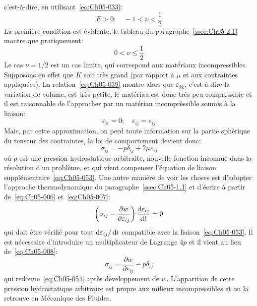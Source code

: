 c'est-à-dire, en utilisant~\eqref{eq:Ch05-033}: 
\begin{equation}
    E>0; \quad -1 < \nu < \frac{1}{2}
    \label{eq:Ch05-051}
\end{equation}
La première condition est évidente, le tableau du paragraphe~\ref{ssec:Ch05-2.1} montre que pratiquement: 
\begin{equation}
    0 < \nu \leq \frac{1}{2}
    \label{eq:Ch05-052}
\end{equation}
Le cas $\nu = 1/2$ est un cas limite, qui correspond aux matériaux incompressibles.
Supposons en effet que $K$ soit très grand (par rapport à $\mu$ et aux contraintes appliquées).
La relation~\eqref{eq:Ch05-039} montre alors que $\varepsilon_{kk}$, c'est-à-dire la variation de volume, est très petite, le matériau est donc très peu compressible et il est raisonnahle de l'approcher par un matériau incompréssible soumis à la liaison: 
\begin{equation}
    \varepsilon_{ii} = 0; \quad \varepsilon_{ij} = e_{ij}
    \label{eq:Ch05-053}
\end{equation}
Mais, par cette approximation, on perd toute information sur la partie sphérique du tenseur des contraintes, la loi de comportement devient donc: 
\begin{equation}
    \sigma_{ij} = -p \delta_{ij} + 2 \mu \varepsilon_{ij}
    \label{eq:Ch05-054}
\end{equation}
où $p$ est une pression hydrostatique arbitraite, nouvelle fonction inconnue dans la résolution d'un problème, et qui vient compenser l'équation de liaison supplémentaire~\eqref{eq:Ch05-053}.
Une autre manière de voir les choses est d'adopter l'approche thermodynamique du paragraphe~\ref{ssec:Ch05-1.1} et d'écrire à partir de~\eqref{eq:Ch05-006} et~\eqref{eq:Ch05-007}: 
\begin{equation}
    \left( \sigma_{ij} - \frac{\partial w}{\partial \varepsilon_{ij}} \right) \frac{\mathop{\mathrm{{}d}}\mathopen{} \varepsilon_{ij}}{\mathop{\mathrm{{}d}}\mathopen{} t} = 0
    \label{eq:Ch05-055}
\end{equation}
qui doit être vérifié pour tout $\mathop{\mathrm{{}d}}\mathopen{} \varepsilon_{ij} / \mathop{\mathrm{{}d}}\mathopen{} t$ compatible avec la liaison~\eqref{eq:Ch05-053}. 
Il est nécessaire d'introduire un multiplicateur de Lagrange $4p$ et il vient au lieu de~\eqref{eq:Ch05-008}: 
\begin{equation}
    \sigma_{ij} = \frac{\partial w}{\partial \varepsilon_{ij}} -p\delta_{ij}
    \label{eq:Ch05-056}
\end{equation}
qui redonne~\eqref{eq:Ch05-054} après développement de $w$.
L'apparition de cette pression hydrostatique arbitraire est propre aux milieux incompressibles et on la retrouve en Mécanique des Fluides.

